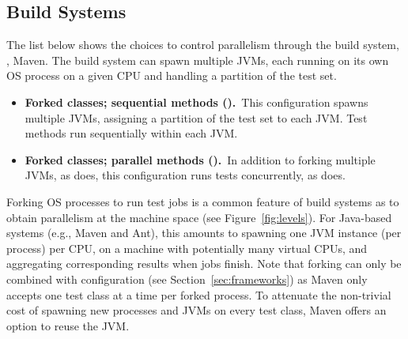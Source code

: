 \subsection{Build Systems}
\label{sec:builder}

The list below shows the choices to control parallelism through the
build system, \eg{}, Maven.  The build system can spawn multiple JVMs,
each running on its own OS process on a given CPU and handling a
partition of the test set.

\begin{itemize}
\item
    \textbf{Forked classes; sequential methods (\ForkSeq).}~This
    configuration spawns multiple JVMs, assigning a partition of the
    test set to each JVM.  Test methods run sequentially within each
    JVM.
\item
    \textbf{Forked classes; parallel methods (\ForkParMeth).}~In
    addition to forking multiple JVMs, as \ForkSeq{} does, this
    configuration runs tests concurrently, as \SeqClassParMeth{} does.
\end{itemize}


Forking OS processes to run test jobs is a common feature of build
systems as to obtain parallelism at the machine space (see
Figure~\ref{fig:levels}).  For Java-based systems (e.g., Maven and
Ant), this amounts to spawning one JVM instance (per process) per CPU,
on a machine with potentially many virtual CPUs, and aggregating
corresponding results when jobs finish.  Note that forking can only be
combined with configuration \SeqClassParMeth{} (see
Section~\ref{sec:frameworks}) as Maven only accepts one test class at
a time per forked process.
To attenuate the non-trivial cost of spawning new processes and JVMs on
every test class, Maven offers an option to reuse the
JVM.


